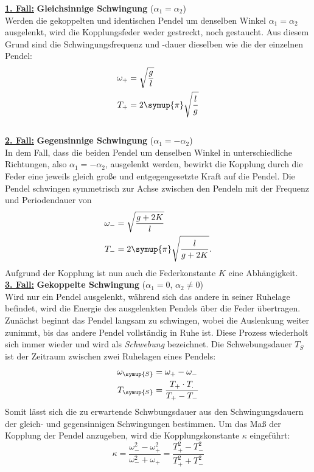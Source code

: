 \underline{\textbf{1. Fall:}} \textbf{Gleichsinnige Schwingung} ($\alpha_1=\alpha_2$) \\
Werden die gekoppelten und identischen Pendel um denselben Winkel $\alpha_1=\alpha_2$ ausgelenkt, wird die Kopplungsfeder weder gestreckt, noch gestaucht.
Aus diesem Grund sind die Schwingungsfrequenz und -dauer dieselben wie die der einzelnen Pendel:
\begin{align}
    \omega_{+} &= \sqrt{\frac{g}{l}} \label{eq:w+} \\
    T_{+} &= 2\symup{\pi}\sqrt{\frac{l}{g}} \label{eq:T+}
\end{align} \\


\underline{\textbf{2. Fall:}} \textbf{Gegensinnige Schwingung} ($\alpha_1=-\alpha_2$) \\
In dem Fall, dass die beiden Pendel um denselben Winkel in unterschiedliche Richtungen, also $\alpha_1=-\alpha_2$, ausgelenkt werden, bewirkt die
Kopplung durch die Feder eine jeweils gleich große und entgegengesetzte Kraft auf die Pendel. Die Pendel schwingen symmetrisch zur Achse zwischen den 
Pendeln mit der Frequenz und Periodendauer von
\begin{align}
    \omega_{-} &= \sqrt{\frac{g+2K}{l}} \label{eq:w-} \\
    T_{-} &= 2\symup{\pi} \sqrt{\frac{l}{g+2K}}. \label{eq:T-}
\end{align}
Aufgrund der Kopplung ist nun auch die Federkonstante $K$ eine Abhängigkeit. \\


\underline{\textbf{3. Fall:}} \textbf{Gekoppelte Schwingung} ($\alpha_1=0$, $\alpha_2\neq 0$) \\
Wird nur ein Pendel ausgelenkt, während sich das andere in seiner Ruhelage befindet, wird die Energie des ausgelenkten Pendels über die
Feder übertragen. Zunächst beginnt das Pendel langsam zu schwingen, wobei die Auslenkung weiter zunimmt, bis das andere Pendel vollständig in Ruhe ist.
Diese Prozess wiederholt sich immer wieder und wird als \textit{Schwebung} bezeichnet. Die Schwebungsdauer $T_{S}$ ist der Zeitraum zwischen zwei Ruhelagen
eines Pendels:
\begin{align}
    \omega_{\symup{S}} &= \omega_{+} - \omega_{-} \label{eq:w_S} \\
    T_{\symup{S}} &= \frac{T_{+}\cdot T_{.}}{T_{+}-T_{-}} \label{eq:T_S} 
\end{align} 
Somit lässt sich die zu erwartende Schwbungsdauer aus den Schwingungsdauern der gleich- und gegensinnigen Schwingungen bestimmen. Um das Maß der Kopplung
der Pendel anzugeben, wird die Kopplungskonstante $\kappa$ eingeführt:
\begin{equation}
    \kappa = \frac{\omega_{-}^2-\omega_{+}^2}{\omega_{-}^2+\omega_{+}} = \frac{T_{+}^2-T_{-}^2}{T_{+}^2+T_{-}^2} \label{eq:Kopplungskonstante}
\end{equation}


